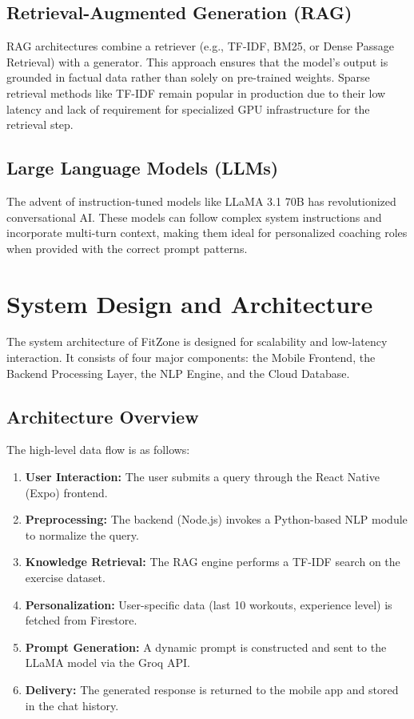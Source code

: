 \documentclass[conference]{IEEEtran}
\begin{document}
\subsection{Retrieval-Augmented Generation (RAG)}
RAG architectures combine a retriever (e.g., TF-IDF, BM25, or Dense Passage Retrieval) with a generator. This approach ensures that the model's output is grounded in factual data rather than solely on pre-trained weights. Sparse retrieval methods like TF-IDF remain popular in production due to their low latency and lack of requirement for specialized GPU infrastructure for the retrieval step.

\subsection{Large Language Models (LLMs)}
The advent of instruction-tuned models like LLaMA 3.1 70B has revolutionized conversational AI. These models can follow complex system instructions and incorporate multi-turn context, making them ideal for personalized coaching roles when provided with the correct prompt patterns.

\section{System Design and Architecture}

The system architecture of FitZone is designed for scalability and low-latency interaction. It consists of four major components: the Mobile Frontend, the Backend Processing Layer, the NLP Engine, and the Cloud Database.

\subsection{Architecture Overview}
The high-level data flow is as follows:
\begin{enumerate}
    \item \textbf{User Interaction:} The user submits a query through the React Native (Expo) frontend.
    \item \textbf{Preprocessing:} The backend (Node.js) invokes a Python-based NLP module to normalize the query.
    \item \textbf{Knowledge Retrieval:} The RAG engine performs a TF-IDF search on the exercise dataset.
    \item \textbf{Personalization:} User-specific data (last 10 workouts, experience level) is fetched from Firestore.
    \item \textbf{Prompt Generation:} A dynamic prompt is constructed and sent to the LLaMA model via the Groq API.
    \item \textbf{Delivery:} The generated response is returned to the mobile app and stored in the chat history.
\end{enumerate}
\end{document}
